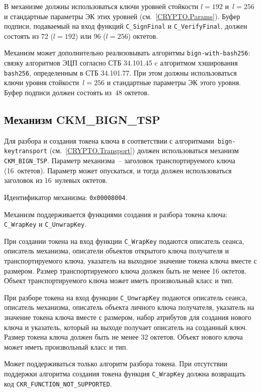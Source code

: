 В механизме должны использоваться ключи уровней стойкости $l=192$ и~$l=256$
и стандартные параметры ЭК этих уровней (см.~\ref{CRYPTO.Params}).
% 
Буфер подписи, подаваемый на вход функций \verb|C_SignFinal| и 
\verb|C_VerifyFinal|, должен состоять из 72 ($l=192$) или 96 ($l=256$) 
октетов. 

Механизм может дополнительно реализовывать алгоритмы 
\texttt{bign-with-bash256}: связку алгоритмов ЭЦП согласно СТБ 34.101.45 c 
алгоритмом хэширования \texttt{bash256}, определенным в СТБ 34.101.77.
При этом должны использоваться ключи уровня стойкости~$l=256$
и стандартные параметры ЭК этого уровня. 
Буфер подписи должен состоять из~$48$ октетов.

\subsection{Механизм CKM\_BIGN\_TSP}\label{CRYPTOKI.Transport}


Для разбора и создания токена ключа в соответствии с 
алгоритмами~\texttt{bign-keytransport} (см.~\ref{CRYPTO.Transport}) должен 
использоваться механизм \verb|CKM_BIGN_TSP|.
%
Параметр механизма~-- заголовок транспортируемого ключа (16~октетов). 
Параметр может опускаться, и тогда должен использоваться
заголовок из 16~нулевых октетов.

Идентификатор механизма: \texttt{0x00008004}.

Механизм поддерживается функциями создания и разбора токена ключа:
\verb|C_WrapKey| и \verb|C_UnwrapKey|.

При создании токена на вход функции \verb|C_WrapKey| подаются
описатель сеанса, описатель механизма, описатели объектов открытого ключа
получателя и транспортируемого ключа, указатель на
выходное значение токена ключа вместе с размером.
Размер транспортируемого ключа должен быть не менее 16 октетов.
Объект транспортируемого ключа может иметь произвольный класс и тип.

При разборе токена на вход функции \verb|C_UnwrapKey| подаются
описатель сеанса, описатель механизма, описатель объекта личного ключа
получателя, указатель на значение токена ключа вместе с размером,
набор атрибутов для создания нового ключа и указатель,
который на выходе получает описатель на созданный ключ.
Размер токена ключа должен быть не менее 32 октетов.
Объект нового ключа может иметь произвольный класс и тип.

Может поддерживаться только алгоритм разбора токена.
При отсутствии поддержки алгоритма создания токена
функция \verb|C_WrapKey| должна возвращать код 
\verb|CKR_FUNCTION_NOT_SUPPORTED|.

